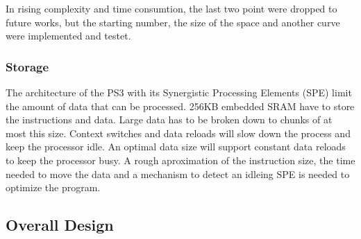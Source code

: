 In rising complexity and time consumtion, the last two point were dropped to future works, but the starting number, the size of the space and another curve were implemented and testet.

\subsubsection{Storage}
\label{sec:concurrency}
The architecture of the PS3 with its Synergistic Processing Elements (SPE) limit the amount of data that can be processed. 256KB embedded SRAM have to store the instructions and data.\cite{PTC}
Large data has to be broken down to chunks of at most this size. Context switches and data reloads will slow down the process and keep the processor idle. An optimal data size will support constant data reloads to keep the processor busy. A rough aproximation of the instruction size, the time needed to move the data and a mechanism to detect an idleing SPE is needed to optimize the program.

\subsection{Overall Design}
\label{sec:overall_design}





